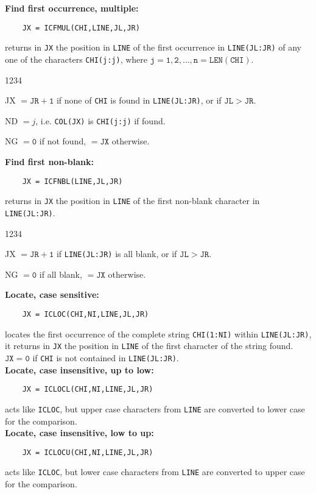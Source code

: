 {\bf Find first occurrence, multiple:}
\begin{verbatim}
    JX = ICFMUL(CHI,LINE,JL,JR)
\end{verbatim}
returns in {\tt JX} the position in {\tt LINE} of the first occurrence
in {\tt LINE(JL:JR)} of any one of the characters {\tt CHI(j:j)},
where $\mathtt{j = 1,2,\ldots,n=LEN(CHI)}$.
\begin{DLtt}{1234}
\item[JX] $\mathtt{=JR+1}$ if none of {\tt CHI} is found in
{\tt LINE(JL:JR)},
or if $\mathtt{JL > JR}$.
\item[ND] $=j$, i.e. {\tt COL(JX)} is {\tt CHI(j:j)} if found.
\item[NG] $\mathtt{=0}$ if not found, $\mathtt{= JX}$ otherwise.
\end{DLtt}
{\bf Find first non-blank:}
\begin{verbatim}
    JX = ICFNBL(LINE,JL,JR)
\end{verbatim}
returns in {\tt JX} the position in {\tt LINE} of the first non-blank
character in {\tt LINE(JL:JR)}.
\begin{DLtt}{1234}
\item[JX] $\mathtt{=JR+1}$ if {\tt LINE(JL:JR)} is all blank,
or if $\mathtt{JL > JR}$.
\item[NG] $\mathtt{=0}$ if all blank, $\mathtt{= JX}$ otherwise.
\end{DLtt}
{\bf Locate, case sensitive:}
\begin{verbatim}
    JX = ICLOC(CHI,NI,LINE,JL,JR)
\end{verbatim}
locates the first occurrence of the complete string {\tt CHI(1:NI)}
within {\tt LINE(JL:JR)}, it returns in {\tt JX} the position in
{\tt LINE} of the first character of the string found.
$\mathtt{JX=0}$ if {\tt CHI} is not contained in {\tt LINE(JL:JR)}.
\\[2mm]
{\bf Locate, case insensitive, up to low:}
\begin{verbatim}
    JX = ICLOCL(CHI,NI,LINE,JL,JR)
\end{verbatim}
acts like {\tt ICLOC}, but upper case characters from {\tt LINE} are
converted to lower case for the comparison. \\[2mm]
{\bf Locate, case insensitive, low to up:}
\begin{verbatim}
    JX = ICLOCU(CHI,NI,LINE,JL,JR)
\end{verbatim}
acts like {\tt ICLOC}, but lower case characters from {\tt LINE} are
converted to upper case for the comparison. \\[2mm]
